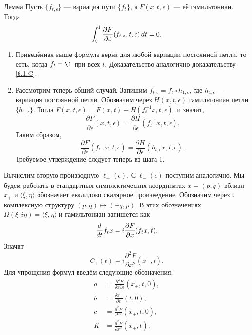 \begin{thm}{Лемма}\label{12.4.B}
Пусть $\{f_{t,\epsilon}\}$ — вариация пути $\{f_t\}$, а $F(x, t,\epsilon)$ — её гамильтониан.
Тогда 
\[\int_0^1\frac{\partial F}{\partial \varepsilon}(f_{t,\varepsilon},t,\varepsilon)\,d t=0.\] 

\end{thm}

\begin{enumerate}[1)]
\item Приведённая выше формула верна для любой вариации постоянной петли, то есть, когда $f_t = \1$ при всех $t$.
Доказательство аналогично доказательству \ref{6.1.C}.
\item Рассмотрим теперь общий случай.
Запишим $f_{t,\epsilon} = f_t \circ h_{1,\epsilon}$, где $h_{1,\epsilon}$ — вариация постоянной петли.
Обозначим через $H(x, t, \epsilon)$ гамильтониан петли $\{h_{1,\epsilon}\}$.
Тогда $F(x,t,\epsilon) = F(x,t) + H(f_t^{-1}x,t,\epsilon)$, и значит, 
\[\frac{\partial F}{\partial \epsilon}(x,t,\epsilon)=\frac{\partial H}{\partial \epsilon}(f_t^{-1}x,t,\epsilon).\]
Таким образом,
\[\frac{\partial F}{\partial \epsilon}(f_{t,\epsilon}x,t,\epsilon)=\frac{\partial H}{\partial \epsilon}(h_{t,\epsilon}x,t,\epsilon).\]
Требуемое утверждение следует теперь из шага 1.
\qeds
\end{enumerate}


Вычислим вторую производную $\ell_+(\epsilon)$.
С $\ell_-(\epsilon)$ поступим аналогично.
Мы будем работать в стандартных симплектических координатах $x = (p, q)$ вблизи $x_+$ и $\langle\xi,\eta\rangle$ обозначает евклидово скалярное произведение.
Обозначим через $i$ комплексную структуру $(p, q) \mapsto (-q, p)$.
В этих обозначениях $\Omega(\xi, i\eta) = \langle\xi,\eta\rangle$ и гамильтониан запишется как
\[\frac{d}{d t}f_tx=i\frac{\partial F}{\partial x}(f_tx,t).\]
Значит
\[C_+(t)=i\frac{\partial^2F}{\partial x^2}(x_+,t).\]
Для упрощения формул введём следующие обозначения: 
\begin{align*}
a&=\frac{\partial^2 F}{\partial x\partial\epsilon}(x_+,t,0),
\\
b&=\frac{\partial x_+}{\partial\epsilon}(t,0),
\\
c&=\frac{\partial^2 F}{\partial\epsilon^2}(x_+,t,0),
\\
K&=\frac{\partial^2 F}{\partial x^2}(x_+,t).
\end{align*}

